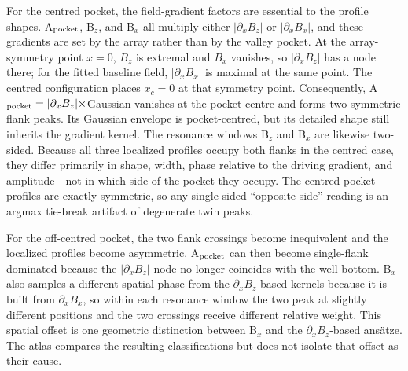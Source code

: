\documentclass[aip,jap,reprint,superscriptaddress,longbibliography,floatfix]{revtex4-2}
\begin{document}
For the centred pocket, the field-gradient factors are essential to the profile
shapes. A$_{\rm pocket}$, B$_z$, and B$_x$ all multiply either
$|\partial_x B_z|$ or $|\partial_x B_x|$, and these gradients are set by the
array rather than by the valley pocket. At the array-symmetry point $x=0$,
$B_z$ is extremal and $B_x$ vanishes, so $|\partial_x B_z|$ has a node there;
for the fitted baseline field, $|\partial_x B_x|$ is maximal at the same
point. The centred configuration places $x_c=0$ at that symmetry point.
Consequently, A$_{\rm pocket}=|\partial_x B_z|\times$Gaussian vanishes at the
pocket centre and forms two symmetric flank peaks. Its Gaussian envelope is
pocket-centred, but its detailed shape still inherits the gradient kernel. The
resonance windows B$_z$ and B$_x$ are likewise two-sided. Because all three
localized profiles occupy both flanks in the centred case, they differ
primarily in shape, width, phase relative to the driving gradient, and
amplitude---not in which side of the pocket they occupy. The centred-pocket
profiles are exactly symmetric, so any single-sided ``opposite side'' reading
is an argmax tie-break artifact of degenerate twin peaks.

For the off-centred pocket, the two flank crossings become inequivalent and the
localized profiles become asymmetric. A$_{\rm pocket}$ can then become
single-flank dominated because the $|\partial_x B_z|$ node no longer coincides
with the well bottom. B$_x$ also samples a different spatial phase from the
$\partial_x B_z$-based kernels because it is built from $\partial_x B_x$, so
within each resonance window the two peak at slightly different positions and
the two crossings receive different relative weight. This spatial offset is one
geometric distinction between B$_x$ and the $\partial_x B_z$-based ans\"atze.
The atlas compares the resulting classifications but does not isolate that
offset as their cause.
\end{document}
